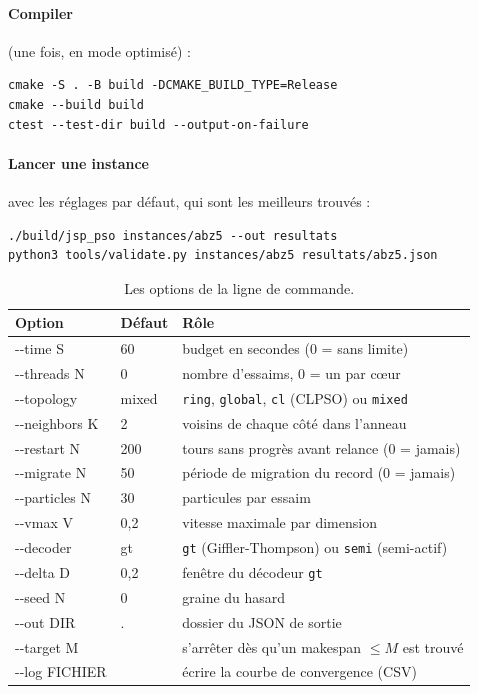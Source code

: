 \documentclass[11pt,a4paper]{article}
\begin{document}
\paragraph{Compiler} (une fois, en mode optimisé) :
\begin{lstlisting}[style=shell]
cmake -S . -B build -DCMAKE_BUILD_TYPE=Release
cmake --build build
ctest --test-dir build --output-on-failure
\end{lstlisting}

\paragraph{Lancer une instance} avec les réglages par défaut, qui sont les meilleurs trouvés :
\begin{lstlisting}[style=shell]
./build/jsp_pso instances/abz5 --out resultats
python3 tools/validate.py instances/abz5 resultats/abz5.json
\end{lstlisting}

\begin{table}[h]
\centering
\caption{Les options de la ligne de commande.}
\small
\begin{tabular}{>{\ttfamily}l l p{8.3cm}}
\toprule
\textrm{Option} & Défaut & Rôle\\
\midrule
-{}-time S       & 60     & budget en secondes (0 = sans limite)\\
-{}-threads N    & 0      & nombre d'essaims, 0 = un par cœur\\
-{}-topology     & mixed  & \texttt{ring}, \texttt{global}, \texttt{cl} (CLPSO) ou \texttt{mixed}\\
-{}-neighbors K  & 2      & voisins de chaque côté dans l'anneau\\
-{}-restart N    & 200    & tours sans progrès avant relance (0 = jamais)\\
-{}-migrate N    & 50     & période de migration du record (0 = jamais)\\
-{}-particles N  & 30     & particules par essaim\\
-{}-vmax V       & 0,2    & vitesse maximale par dimension\\
-{}-decoder      & gt     & \texttt{gt} (Giffler-Thompson) ou \texttt{semi} (semi-actif)\\
-{}-delta D      & 0,2    & fenêtre du décodeur \texttt{gt}\\
-{}-seed N       & 0      & graine du hasard\\
-{}-out DIR      & .      & dossier du JSON de sortie\\
-{}-target M     &        & s'arrêter dès qu'un makespan $\le M$ est trouvé\\
-{}-log FICHIER  &        & écrire la courbe de convergence (CSV)\\
\bottomrule
\end{tabular}
\end{table}
\end{document}
